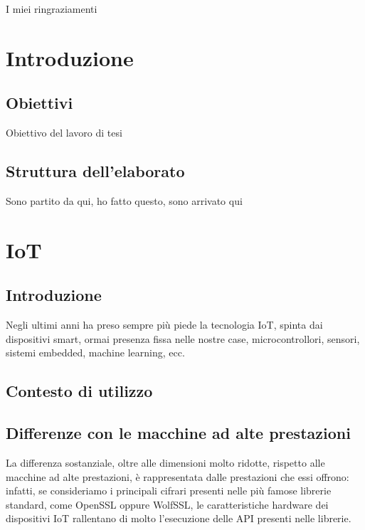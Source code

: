 \documentclass[12pt,a4paper,italian]{report}
\begin{document}

\frontespizio \beforepreface

 I miei ringraziamenti

\afterpreface

\listoftodos

\chapter{Introduzione}

\section{Obiettivi}

Obiettivo del lavoro di tesi

\section{Struttura dell'elaborato}

Sono partito da qui, ho fatto questo, sono arrivato qui

\newpage

\chapter{IoT}

\section{Introduzione}

Negli ultimi anni ha preso sempre più piede la tecnologia IoT, spinta dai dispositivi smart, ormai presenza fissa nelle nostre case, microcontrollori, sensori, sistemi embedded, machine learning, ecc.

\section{Contesto di utilizzo}

\section{Differenze con le macchine ad alte prestazioni}

La differenza sostanziale, oltre alle dimensioni molto ridotte, rispetto alle macchine ad alte prestazioni, è rappresentata dalle prestazioni che essi offrono: infatti, se consideriamo i principali cifrari presenti nelle più famose librerie standard, come OpenSSL oppure WolfSSL, le caratteristiche hardware dei dispositivi IoT rallentano di molto l'esecuzione delle API presenti nelle librerie.
\end{document}
